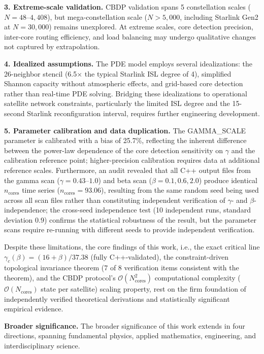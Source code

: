 \documentclass[sn-nature,pdflatex]{sn-jnl}
\begin{document}
\textbf{3. Extreme-scale validation.}
CBDP validation spans 5 constellation scales ($N=48$--$4,408$), but mega-constellation scale ($N>5,000$, including Starlink Gen2 at $N=30,000$) remains unexplored.
At extreme scales, core detection precision, inter-core routing efficiency, and load balancing may undergo qualitative changes not captured by extrapolation.

\textbf{4. Idealized assumptions.}
The PDE model employs several idealizations: the 26-neighbor stencil (6.5$\times$ the typical Starlink ISL degree of 4), simplified Shannon capacity without atmospheric effects, and grid-based core detection rather than real-time PDE solving.
Bridging these idealizations to operational satellite network constraints, particularly the limited ISL degree and the 15-second Starlink reconfiguration interval, requires further engineering development.

\textbf{5. Parameter calibration and data duplication.}
The GAMMA\_SCALE parameter is calibrated with a bias of 25.7\%, reflecting the inherent difference between the power-law dependence of the core detection sensitivity on $\gamma$ and the calibration reference point; higher-precision calibration requires data at additional reference scales. Furthermore, an audit revealed that all C++ output files from the gamma scan ($\gamma=0.43$--$1.0$) and beta scan ($\beta=0.1, 0.6, 2.0$) produce identical $n_{\text{cores}}$ time series ($n_{\text{cores}}=93.06$), resulting from the same random seed being used across all scan files rather than constituting independent verification of $\gamma$- and $\beta$-independence; the cross-seed independence test (10 independent runs, standard deviation $0.9$) confirms the statistical robustness of the result, but the parameter scans require re-running with different seeds to provide independent verification.

Despite these limitations, the core findings of this work, i.e., the exact critical line $\gamma_c(\beta) = (16+\beta)/37.38$ (fully C++-validated), the constraint-driven topological invariance theorem (7 of 8 verification items consistent with the theorem), and the CBDP protocol's $\mathcal{O}(N_{\text{cores}}^2)$ computational complexity ($\mathcal{O}(N_{\text{cores}})$ state per satellite) scaling property, rest on the firm foundation of independently verified theoretical derivations and statistically significant empirical evidence.

\bigskip\noindent\textbf{Broader significance.}
The broader significance of this work extends in four directions, spanning fundamental physics, applied mathematics, engineering, and interdisciplinary science.
\end{document}
